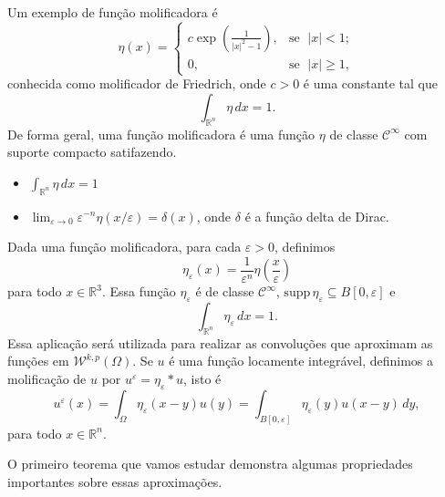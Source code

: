 \documentclass[a4paper, 11pt]{book}
\theoremstyle{definition}
\newcommand{\bR}{\mathbb{R}}
\newcommand{\cC}{\mathcal{C}}
\newcommand{\cW}{\mathcal{W}}
\newcommand{\supp}{\mathrm{supp}\,}
\begin{document}
Um exemplo de função molificadora é
\begin{equation} \label{eq:molificador-friedrich}
    \eta(x) =
    \left\{
        \begin{array}{lr}
            c \exp \left( \frac{1}{|x|^2 - 1} \right), &\! \text{se }\; |x| < 1;\\
            0, &\!\text{se }\; |x| \geqslant 1,
        \end{array}
    \right.
\end{equation}
conhecida como molificador de Friedrich, onde $c > 0$ é uma constante tal que
\[
    \int_{\bR^n} \eta \,dx = 1.
\]
De forma geral, uma função molificadora é uma função $\eta$ de classe $\cC^\infty$ com suporte compacto satifazendo. 
\begin{itemize}[leftmargin=*]
    \item $\displaystyle \int_{\bR^n} \eta \,dx = 1$
    \item $\displaystyle \lim_{\varepsilon \to 0} \varepsilon^{-n}\eta(x/\varepsilon) = \delta(x)$, onde $\delta$ é a função delta de Dirac.
\end{itemize}
Dada uma função molificadora, para cada $\varepsilon > 0$, definimos
\begin{equation} \label{eq:eta-epsilon}
    \eta_\varepsilon(x) = \frac{1}{\varepsilon^n} \eta\left( \frac{x}{\varepsilon} \right)
\end{equation}
para todo $x \in \bR^3$. Essa função $\eta_\varepsilon$ é de classe $\cC^\infty$, $\supp \eta_\varepsilon \subseteq B[0,\varepsilon]$ e
\[
    \int_{\bR^n} \eta_\varepsilon \,dx = 1.
\]
Essa aplicação será utilizada para realizar as convoluções que aproximam as funções em $\cW^{k,p}(\Omega)$. Se $u$ é uma função locamente integrável, definimos a molificação de $u$ por $u^\varepsilon = \eta_\varepsilon * u$, isto é
\[
    u^\varepsilon(x) = \int_\Omega \eta_\varepsilon(x-y) u(y) = \int_{B[0,\varepsilon]} \eta_\varepsilon(y) u(x-y) \,dy,
\]
para todo $x \in \bR^n$.

O primeiro teorema que vamos estudar demonstra algumas propriedades importantes sobre essas aproximações.
\end{document}
